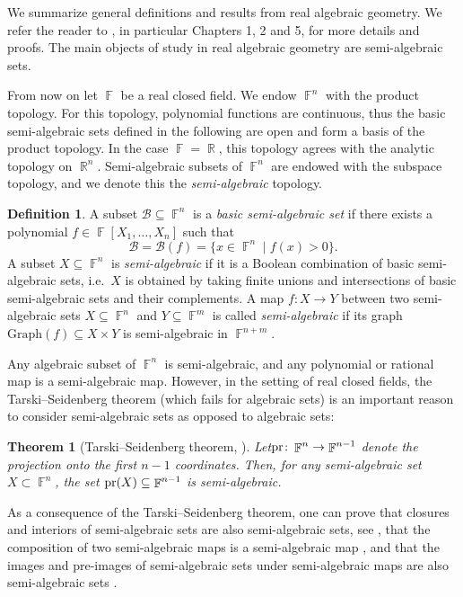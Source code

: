 \documentclass{amsart}
\theoremstyle{plain}
\newtheorem{theorem}[proposition]{Theorem}
\theoremstyle{definition}
\newtheorem{definition}[proposition]{Definition}
\DeclareMathOperator{\Fb}{{\mathbb{F}}}
\DeclareMathOperator{\Rb}{{\mathbb{R}}}
\newcommand*\from{\colon}
\newcommand{\pr}{\textnormal{pr}}
\newcommand{\1}{\mathbf{1}}
\begin{document}
We summarize general definitions and results from real algebraic geometry.
We refer the reader to \cite{BochnakCosteRoy_RealAlgebraicGeometry}, in particular Chapters 1, 2 and 5, for more details and proofs.
The main objects of study in real algebraic geometry are semi-algebraic sets.

From now on let $\Fb$ be a real closed field.
We endow $\Fb^n$ with the product topology.
For this topology, polynomial functions are continuous, thus the basic semi-algebraic sets defined in the following are open and form a basis of the product topology.
In the case $\Fb=\Rb$, this topology agrees with the analytic topology on $\Rb^n$.
Semi-algebraic subsets of $\Fb^n$ are endowed with the subspace topology, and we denote this the \emph{semi-algebraic} topology.

\begin{definition}
\label{dfn_SemiAlgSet}
A subset $\mathcal{B} \subseteq \Fb^n$ is a \emph{basic semi-algebraic set} if there exists a polynomial $f \in \Fb[X_1,\ldots,X_n]$ such that
\[ \mathcal{B} = \mathcal{B}(f)= \{ x \in \Fb^n \mid f(x)>0\}.\]
A subset $X \subseteq \Fb^n$ is \emph{semi-algebraic} if it is a Boolean combination of basic semi-algebraic sets, i.e.\ $X$ is obtained by taking finite unions and intersections of basic semi-algebraic sets and their complements. A map $f \from X \to Y$ between two semi-algebraic sets $X \subseteq \Fb^n$ and $Y \subseteq \Fb^m$ is called \emph{semi-algebraic} if its graph $\textrm{Graph}(f) \subseteq X \times Y$ is semi-algebraic in $\Fb^{n+m}$.
\end{definition}

Any algebraic subset of $\Fb^n$ is semi-algebraic, and any polynomial or rational map is a semi-algebraic map. However, in the setting of real closed fields, the Tarski--Seidenberg theorem (which fails for algebraic sets) is an important reason to consider semi-algebraic sets as opposed to algebraic sets:

\begin{theorem}[Tarski--Seidenberg theorem, {\cite[Theorem 5.2.1]{BochnakCosteRoy_RealAlgebraicGeometry}}]
\label{thm_TarskiSeidenbergproj}
Let\break $\pr \from \Fb^n \to \Fb^{n-1}$ denote the projection onto the first $n-1$ coordinates. Then, for any semi-algebraic set $X\subset \Fb^n$, the set $\pr(X) \subseteq \Fb^{n-1}$ is semi-algebraic.
\end{theorem}

As a consequence of the Tarski--Seidenberg theorem, one can prove that closures and interiors of semi-algebraic sets are also semi-algebraic sets, see \cite[Propositions 2.2.2]{BochnakCosteRoy_RealAlgebraicGeometry}, that the composition of two semi-algebraic maps is a semi-algebraic map \cite[Propositions 2.2.6]{BochnakCosteRoy_RealAlgebraicGeometry}, and that the images and pre-images of semi-algebraic sets under semi-algebraic maps are also semi-algebraic sets \cite[Proposition 2.2.7]{BochnakCosteRoy_RealAlgebraicGeometry}.
\end{document}
